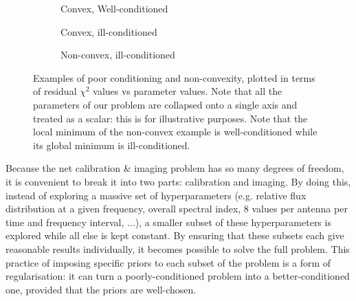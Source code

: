 \begin{figure}[h!]
\centering
\begin{subfigure}{.32\textwidth}
\caption{\label{fig.goodconditioning} Convex, Well-conditioned}
\end{subfigure}
\hfill
\begin{subfigure}{.32\textwidth}
\caption{\label{fig.badconditioning} Convex, ill-conditioned}
\end{subfigure}
\hfill
\begin{subfigure}{.32\textwidth}
\caption{\label{fig.notconvex} Non-convex, ill-conditioned}
\end{subfigure}
\caption{\label{fig.examples} Examples of poor conditioning and non-convexity, plotted in terms of residual $\chi^2$ values vs parameter values.  Note that all the parameters of our problem are collapsed onto a single axis and treated as a scalar: this is for illustrative purposes. Note that the local minimum of the non-convex example is well-conditioned while its global minimum is ill-conditioned.}
\end{figure}


\pg
Because the net calibration \& imaging problem has so many degrees of freedom, it is convenient to break it into two parts: calibration and imaging. By doing this, instead of exploring a massive set of hyperparameters (e.g. relative flux distribution at a given frequency, overall spectral index, 8 values per antenna per time and frequency interval, ...), a smaller subset of these hyperparameters is explored while all else is kept constant. By ensuring that these subsets each give reasonable results individually, it becomes possible to solve the full problem. This practice of imposing specific priors to each subset of the problem is a form of regularisation: it can turn a poorly-conditioned problem into a better-conditioned one, provided that the priors are well-chosen.

